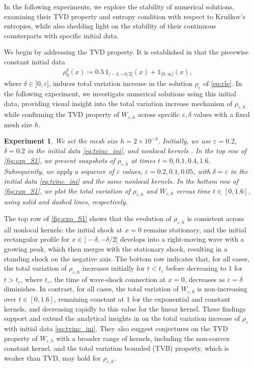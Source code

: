 \documentclass[10pt]{amsart}
\theoremstyle{plain}
\newtheorem{example}{Experiment}[section]
\theoremstyle{definition}
\numberwithin{equation}{section}
\newcommand{\eps}{{\varepsilon}}
\begin{document}
In the following experiments, we explore the stability of numerical solutions, examining their TVD property and entropy condition with respect to Kru\v{z}kov's entropies, while also shedding light on the stability of their continuous counterparts with specific initial data.

We begin by addressing the TVD property. It is established in \cite{MR4300935} that the piecewise constant initial data
\begin{align}\label{eq:tvinc_ini}
    \rho_0^\delta(x) \coloneqq 0.5\,\mathds{1}_{]-\delta,-\delta/2[}(x) + \mathds{1}_{[0,\infty[}(x),
\end{align}
where $\delta\in]0,\eps]$, induces total variation increase in the solution $\rho_\eps$ of  \cref{eq:cle}. In the following experiment, we investigate numerical solutions using this initial data, providing visual insight into the total variation increase mechanism of $\rho_{\varepsilon,h}$ while confirming the TVD property of $W_{\varepsilon,h}$ across specific $\varepsilon,\delta$ values with a fixed mesh size $h$.
\begin{example}
We set the mesh size $h=2\times10^{-3}$. Initially, we use $\eps=0.2$, $\delta=0.2$ in the initial data \cref{eq:tvinc_ini}, and nonlocal kernels . In the top row of \cref{fig:exp_S1}, we present snapshots of $\rho_{\eps,h}$ at times $t=0,0.1,0.4,1.6$. Subsequently, we apply a sequence of $\eps$ values, $\eps=0.2,0.1,0.05$, with $\delta=\eps$ in the initial data \cref{eq:tvinc_ini} and the same nonlocal kernels. In the bottom row of \cref{fig:exp_S1}, we plot the total variation of $\rho_{\eps,h}$ and $W_{\eps,h}$ versus time $t\in[0,1.6]$, using solid and dashed lines, respectively.
\end{example}

The top row of \cref{fig:exp_S1} shows that the evolution of $\rho_{\varepsilon,h}$ is consistent across all nonlocal kernels: the initial shock at $x=0$ remains stationary, and the initial rectangular profile for $x\in]-\delta,-\delta/2[$ develops into a right-moving wave with a growing peak, which then merges with the stationary shock, resulting in a standing shock on the negative axis. The bottom row indicates that, for all cases, the total variation of $\rho_{\varepsilon,h}$ increases initially for $t<t_\varepsilon$ before decreasing to $1$ for $t>t_\varepsilon$, where $t_\varepsilon$, the time of wave-shock connection at $x=0$, decreases as $\varepsilon=\delta$ diminishes. In contrast, for all cases, the total variation of $W_{\varepsilon,h}$ is non-increasing over $t\in[0,1.6]$, remaining constant at $1$ for the exponential and constant kernels, and decreasing rapidly to this value for the linear kernel. These findings support and extend the analytical insights in \cite{MR4300935} on the total variation increase of $\rho_\eps$ with initial data \cref{eq:tvinc_ini}. They also suggest conjectures on the TVD property of $W_{\varepsilon,h}$ with a broader range of kernels, including the non-convex constant kernel, and the total variation bounded (TVB) property, which is weaker than TVD, may hold for $\rho_{\varepsilon,h}$.
\end{document}
